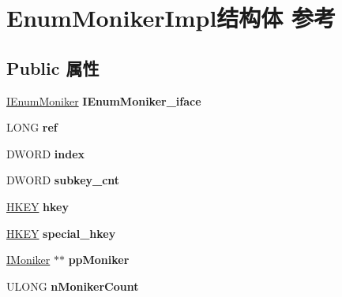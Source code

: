 \hypertarget{struct_enum_moniker_impl}{}\section{Enum\+Moniker\+Impl结构体 参考}
\label{struct_enum_moniker_impl}
\subsection*{Public 属性}
\begin{DoxyCompactItemize}
\item 
\mbox{\label{struct_enum_moniker_impl_a234c632ea4b09b5a16737d2e06998ca0}} 
\hyperlink{interface_i_enum_moniker}{I\+Enum\+Moniker} {\bfseries I\+Enum\+Moniker\+\_\+iface}
\item 
\mbox{\label{struct_enum_moniker_impl_aba11ae5228447ddf3627514b67afd709}} 
L\+O\+NG {\bfseries ref}
\item 
\mbox{\label{struct_enum_moniker_impl_a9758925063edde4a4479a92cc9dbc0da}} 
D\+W\+O\+RD {\bfseries index}
\item 
\mbox{\label{struct_enum_moniker_impl_ab4ce84096f99c4228ff15ca7dd2cf331}} 
D\+W\+O\+RD {\bfseries subkey\+\_\+cnt}
\item 
\mbox{\label{struct_enum_moniker_impl_a734efa5cb522e06fd003ce448bb7d04b}} 
\hyperlink{interfacevoid}{H\+K\+EY} {\bfseries hkey}
\item 
\mbox{\label{struct_enum_moniker_impl_a20a9dff79cd6efdf5ccbfba2948a3042}} 
\hyperlink{interfacevoid}{H\+K\+EY} {\bfseries special\+\_\+hkey}
\item 
\mbox{\label{struct_enum_moniker_impl_a67734f21ffc6f82467ae7e47b5e2dadc}} 
\hyperlink{interface_i_moniker}{I\+Moniker} $\ast$$\ast$ {\bfseries pp\+Moniker}
\item 
\mbox{\label{struct_enum_moniker_impl_a7a46e2625469c89a6d8136a896ae0aa0}} 
U\+L\+O\+NG {\bfseries n\+Moniker\+Count}
\item 
$$
\end{DoxyCompactItemize}

